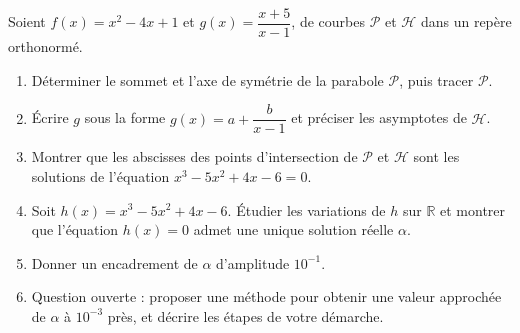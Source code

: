 \documentclass[11pt]{article}
\begin{document}
\begin{exercice}
Soient $f(x)=x^{2}-4x+1$ et $g(x)=\dfrac{x+5}{x-1}$, de courbes $\mathcal{P}$ et $\mathcal{H}$ dans un repère orthonormé.
\begin{enumerate}
\item Déterminer le sommet et l'axe de symétrie de la parabole $\mathcal{P}$, puis tracer $\mathcal{P}$.
\item Écrire $g$ sous la forme $g(x)=a+\dfrac{b}{x-1}$ et préciser les asymptotes de $\mathcal{H}$.
\item Montrer que les abscisses des points d'intersection de $\mathcal{P}$ et $\mathcal{H}$ sont les solutions de l'équation $x^{3}-5x^{2}+4x-6=0$.
\item Soit $h(x)=x^{3}-5x^{2}+4x-6$. Étudier les variations de $h$ sur $\mathbb{R}$ et montrer que l'équation $h(x)=0$ admet une unique solution réelle $\alpha$.
\item Donner un encadrement de $\alpha$ d'amplitude $10^{-1}$.
\item Question ouverte : proposer une méthode pour obtenir une valeur approchée de $\alpha$ à $10^{-3}$ près, et décrire les étapes de votre démarche.
\end{enumerate}
\end{exercice}
\end{document}
